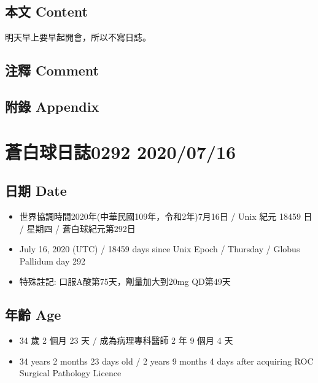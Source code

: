 \documentclass[a5paper, 11pt
]{book}
\providecommand{\tightlist}{%
  \setlength{\itemsep}{0pt}\setlength{\parskip}{0pt}}
\begin{document}
\hypertarget{ux672cux6587-content-44}{%
\subsection{本文 Content}\label{ux672cux6587-content-44}}

明天早上要早起開會，所以不寫日誌。

\hypertarget{ux6ce8ux91cb-comment-44}{%
\subsection{注釋 Comment}\label{ux6ce8ux91cb-comment-44}}

\hypertarget{ux9644ux9304-appendix-44}{%
\subsection{附錄 Appendix}\label{ux9644ux9304-appendix-44}}

\hypertarget{ux84bcux767dux7403ux65e5ux8a8c0292-20200716}{%
\section{蒼白球日誌0292
2020/07/16}\label{ux84bcux767dux7403ux65e5ux8a8c0292-20200716}}

\hypertarget{ux65e5ux671f-date-45}{%
\subsection{日期 Date}\label{ux65e5ux671f-date-45}}

\begin{itemize}
\tightlist
\item
  世界協調時間2020年(中華民國109年，令和2年)7月16日 / Unix 紀元 18459 日
  / 星期四 / 蒼白球紀元第292日
\item
  July 16, 2020 (UTC) / 18459 days since Unix Epoch / Thursday / Globus
  Pallidum day 292
\item
  特殊註記: 口服A酸第75天，劑量加大到20mg QD第49天
\end{itemize}

\hypertarget{ux5e74ux9f61-age-45}{%
\subsection{年齡 Age}\label{ux5e74ux9f61-age-45}}

\begin{itemize}
\tightlist
\item
  34 歲 2 個月 23 天 / 成為病理專科醫師 2 年 9 個月 4 天
\item
  34 years 2 months 23 days old / 2 years 9 months 4 days after
  acquiring ROC Surgical Pathology Licence
\end{itemize}
\end{document}
